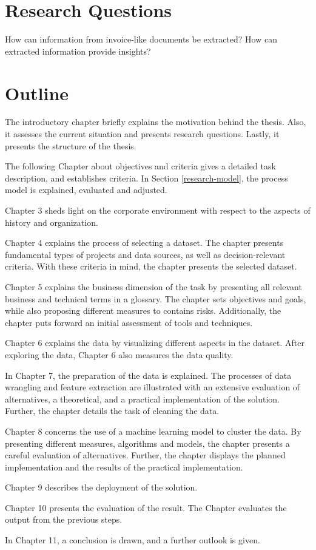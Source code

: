 \section{Research Questions}
\label{section:research-q}
How can information from invoice-like documents be extracted?
How can extracted information provide insights?

\section{Outline}
The introductory chapter briefly explains the motivation behind the thesis. Also, it assesses the current situation and presents research questions. Lastly, it presents the structure of the thesis.

The following Chapter about objectives and criteria gives a detailed task description, and establishes criteria. In Section \ref{research-model}, the process model is explained, evaluated and adjusted.

Chapter 3 sheds light on the corporate environment with respect to the aspects of history and organization.

Chapter 4 explains the process of selecting a dataset. The chapter presents fundamental types of projects and data sources, as well as decision-relevant criteria. With these criteria in mind, the chapter presents the selected dataset.

Chapter 5 explains the business dimension of the task by presenting all relevant business and technical terms in a glossary. The chapter sets objectives and goals, while also proposing different measures to contains risks.
Additionally, the chapter puts forward an initial assessment of tools and techniques.

Chapter 6 explains the data by visualizing different aspects in the dataset. After exploring the data, Chapter 6 also measures the data quality.

In Chapter 7, the preparation of the data is explained. The processes of data wrangling and feature extraction are illustrated with an extensive evaluation of alternatives, a theoretical, and a practical implementation of the solution. Further, the chapter details the task of cleaning the data.

Chapter 8 concerns the use of a machine learning model to cluster the data. By presenting different measures, algorithms and models, the chapter presents a careful evaluation of alternatives. Further, the chapter displays the planned implementation and the results of the practical implementation.

Chapter 9 describes the deployment of the solution.

Chapter 10 presents the evaluation of the result. The Chapter evaluates the output from the previous steps.

In Chapter 11, a conclusion is drawn, and a further outlook is given.